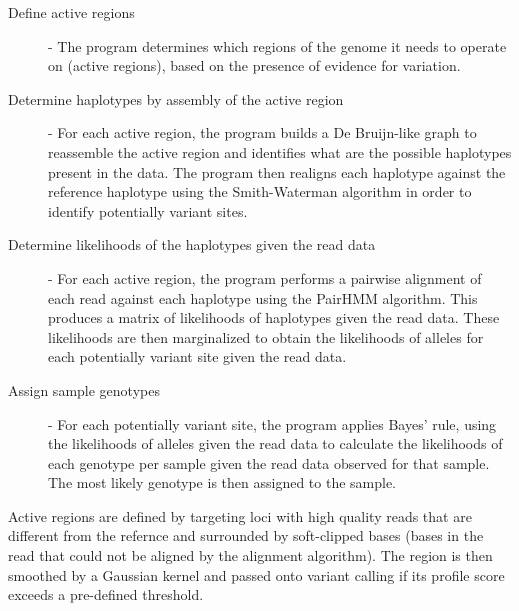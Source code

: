\begin{description}
    \item [Define active regions] - The program determines which regions of the genome it needs to operate on (active regions), based on the presence of evidence for variation. 
    \item [Determine haplotypes by assembly of the active region] - For each active region, the program builds a De Bruijn-like graph to reassemble the active region and identifies what are the possible haplotypes present in the data. The program then realigns each haplotype against the reference haplotype using the Smith-Waterman algorithm in order to identify potentially variant sites.
    \item [Determine likelihoods of the haplotypes given the read data] - For each active region, the program performs a pairwise alignment of each read against each haplotype using the PairHMM algorithm. This produces a matrix of likelihoods of haplotypes given the read data. These likelihoods are then marginalized to obtain the likelihoods of alleles for each potentially variant site given the read data.
    \item [Assign sample genotypes] - For each potentially variant site, the program applies Bayes' rule, using the likelihoods of alleles given the read data to calculate the likelihoods of each genotype per sample given the read data observed for that sample. The most likely genotype is then assigned to the sample.
\end{description}

Active regions are defined by targeting loci with high quality reads that are different from the refernce and surrounded by soft-clipped bases (bases in the read that could not be aligned by the alignment algorithm). The region is then smoothed by a Gaussian kernel and passed onto variant calling if its profile score exceeds a pre-defined threshold. 

